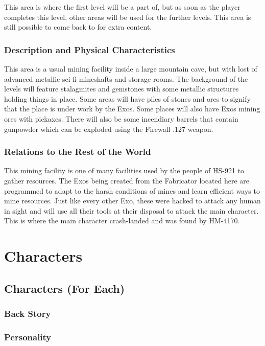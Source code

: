 \documentclass[12pt]{article}
\begin{document}
This area is where the first level will be a part of, but as soon as the player completes this level, other areas will be used for the further levels. This area is still possible to come back to for extra content. 

\subsubsection{Description and Physical Characteristics}

This area is a usual mining facility inside a large mountain cave, but with lost of advanced metallic sci-fi mineshafts and storage rooms. The background of the levels will feature stalagmites and gemstones with some metallic structures holding things in place. Some areas will have piles of stones and ores to signify that the place is under work by the Exos. Some places will also have Exos mining ores with pickaxes. There will also be some incendiary barrels that contain gunpowder which can be exploded using the Firewall .127 weapon. 

\subsubsection{Relations to the Rest of the World}

This mining facility is one of many facilities used by the people of HS-921 to gather resources. The Exos being created from the Fabricator located here are programmed to adapt to the harsh conditions of mines and learn efficient ways to mine resources. Just like every other Exo, these were hacked to attack any human in sight and will use all their tools at their disposal to attack the main character. This is where the main character crash-landed and was found by HM-4170.

\section{Characters}

\subsection{Characters (For Each)}

\subsubsection{Back Story}

\subsubsection{Personality}
\end{document}
